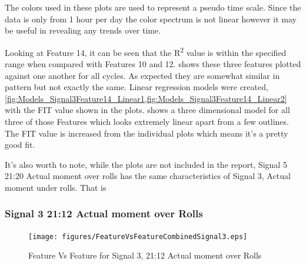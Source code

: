 \documentclass[]{article}
\begin{document}
The colors used in these plots are used to represent a pseudo time scale. Since the data is only from 1 hour per day the color spectrum is not linear however it may be useful in revealing any trends over time.

Looking at Feature 14, it can be seen that the R\textsuperscript{2} value is within the specified range when compared with Features 10 and 12.  shows these three features plotted against one another for all cycles. As expected they are somewhat similar in pattern but not exactly the same. Linear regression models were created, \cref{fig:Models_Signal3Feature14_Linear1,fig:Models_Signal3Feature14_Linear2} with the FIT value shown in the plots.  shows a three dimensional model for all three of those Features which looks extremely linear apart from a few outlines. The FIT value is increased from the individual plots which means it's a pretty good fit.

It's also worth to note, while the plots are not included in the report, Signal 5 21:20 Actual moment over rolls has the same characteristics of Signal 3, Actual moment under rolls. That is 

\subsubsection*{Signal 3 21:12 Actual moment over Rolls}
\begin{figure}[H]
    \centering
    \texttt{[image: figures/FeatureVsFeatureCombinedSignal3.eps]}
    \caption{Feature Vs Feature for Signal 3, 21:12 Actual moment over Rolls}
    \label{fig:FeatureVsFeatureCombinedSignal3}
\end{figure}
\end{document}
